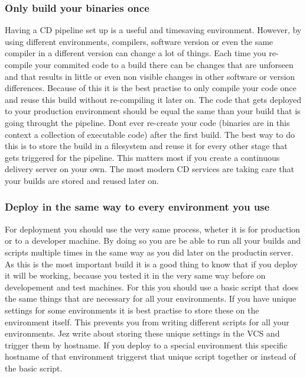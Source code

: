 \subsubsection{Only build your binaries once}
Having a CD pipeline set up is a useful and timesaving environment. However, by using different environments, compilers, software version or even the same
compiler in a different version can change a lot of things. Each time you re-compile your commited code to a build there can be changes that are unforseen
and that results in little or even non visible changes in other software or version differences. Because of this it is the best practise to only compile your
code once and reuse this build without re-compiling it later on. The code that gets deployed to your production environment should be equal the same than
your build that is going throught the pipeline. Dont ever re-create your code (binaries are in this context a collection of executable code) after the first
build. The best way to do this is to store the build in a filesystem and reuse it for every other stage that gets triggered for the pipeline. This matters most
if you create a continuous delivery server on your own. The most modern CD services are taking care that your builds are stored and reused later on.

\subsubsection{Deploy in the same way to every environment you use}
For deployment you should use the very same process, wheter it is for production or to a developer machine. By doing so you are be able to run all your builds
and scripts multiple times in the same way as you did later on the productin server. As this is the most important build it is a good thing to know that if
you deploy it will be working, because you tested it in the very same way before on developement and test machines. For this you should use a basic script that
does the same things that are necessary for all your environments. If you have unique settings for some environments it is best practise to store these on the
environment itself. This prevents you from writing different scripts for all your environments. Jez write about storing these unique settings in the VCS and
trigger them by hostname. If you deploy to a special environment this specific hostname of that environment triggerst that unique script together or instead
of the basic script.

